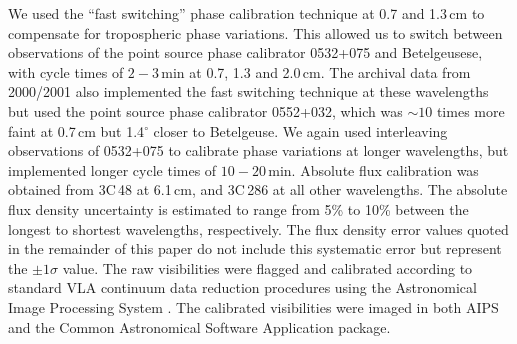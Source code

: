 \documentclass[iop]{emulateapj}
\begin{document}
We used the ``fast switching'' phase calibration technique at 0.7 and 1.3\,cm to compensate for tropospheric phase variations. This allowed us to switch between observations of the point source phase calibrator 0532+075 and Betelgeusese, with cycle times of $2-3$\,min at 0.7, 1.3 and 2.0\,cm. The archival data from 2000/2001 also implemented the fast switching technique at these wavelengths but used the point source phase calibrator 0552+032, which was $\sim 10$ times more faint at 0.7\,cm but 1.4$^{\circ}$ closer to Betelgeuse. We again used interleaving observations of 0532+075 to calibrate phase variations at longer wavelengths, but implemented longer cycle times of $10-20$\,min. Absolute flux calibration was obtained from 3C\,48 at 6.1\,cm, and 3C\,286 at all other wavelengths. The absolute flux density uncertainty is estimated to range from 5\% to 10\% between the longest to shortest wavelengths, respectively. The flux density error values quoted in the remainder of this paper do not include this systematic error but represent the $\pm 1\sigma$ value. The raw visibilities were flagged and calibrated according to standard VLA continuum data reduction procedures using the Astronomical Image Processing System \cite[AIPS;][]{greisen_1990}. The calibrated visibilities were imaged in both AIPS and the Common Astronomical Software Application  \cite[CASA;][]{mcmullin_2007} package.
\end{document}
